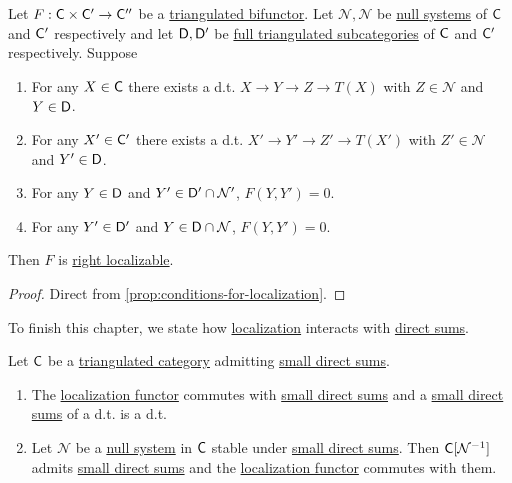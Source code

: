 \documentclass[../../main]{subfiles}
\begin{document}
\begin{theorem}\label{thm:conditions-localization-null-system-bifunctor}
  Let \(F: \mathsf{C} \times \mathsf{C'} \to \mathsf{C''}\) be a \hyperref[def:triangulated-functor]{triangulated bifunctor}.
  Let \(\mathcal{N}, \mathcal{N}\) be \hyperref[def:null-system]{null systems} of \(\mathsf{C}\) and \(\mathsf{C'}\) respectively and let \(\mathsf{D}, \mathsf{D'}\) be \hyperref[def:triangulated-subcategory]{full triangulated subcategories} of \(\mathsf{C}\) and \(\mathsf{C'}\) respectively.
  Suppose
  \begin{enumerate}
    \item For any \(X \in \mathsf{C}\) there exists a d.t. \(X \to Y \to Z \to T(X)\) with \(Z \in \mathcal{N}\) and \(Y \in \mathsf{D}\).
    \item For any \(X' \in \mathsf{C'}\) there exists a d.t. \(X' \to Y' \to Z' \to T(X')\) with \(Z' \in \mathcal{N}\) and \(Y' \in \mathsf{D}\).
    \item For any \(Y \in \mathsf{D}\) and \(Y' \in \mathsf{D'} \cap \mathcal{N}'\), \(F(Y, Y') = 0\).
    \item For any \(Y' \in \mathsf{D'}\) and \(Y \in \mathsf{D} \cap \mathcal{N}\), \(F(Y, Y') = 0\).
  \end{enumerate}
  Then \(F\) is \hyperref[def:localizable-functor]{right localizable}.
\end{theorem}
\begin{proof}
  Direct from \autoref{prop:conditions-for-localization}.
\end{proof}


To finish this chapter, we state how \hyperref[def:localization-category]{localization} interacts with \hyperref[def:direct-sum]{direct sums}.
\begin{proposition}
  Let \(\mathsf{C}\) be a \hyperref[def:triangulated-category]{triangulated category} admitting \hyperref[def:direct-sum]{small direct sums}.
  \begin{enumerate}
    \item The \hyperref[def:localization-category]{localization functor} commutes with \hyperref[def:direct-sum]{small direct sums} and a \hyperref[def:direct-sum]{small direct sums} of a d.t. is a d.t.
    \item Let \(\mathcal{N}\) be a \hyperref[def:null-system]{null system} in \(\mathsf{C}\) stable under \hyperref[def:direct-sum]{small direct sums}. Then \(\mathsf{C}[\mathcal{N}^{-1}]\) admits \hyperref[def:direct-sum]{small direct sums} and the \hyperref[def:localization-category]{localization functor} commutes with them.
  \end{enumerate}
\end{proposition}
\end{document}
